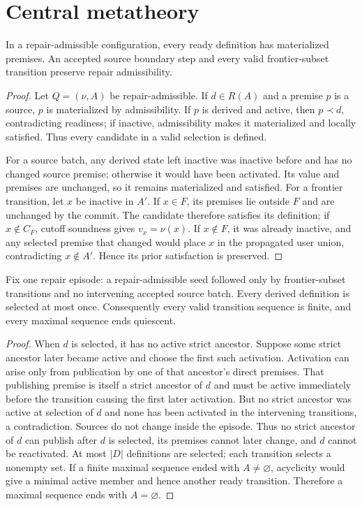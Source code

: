 \section{Central metatheory}\label{sec:meta}
\begin{lemma}\label{lem:preservation}
In a repair-admissible configuration, every ready definition has materialized premises. An accepted source boundary step and every valid frontier-subset transition preserve repair admissibility.
\end{lemma}
\begin{proof}
Let $Q=(\nu,A)$ be repair-admissible. If $d\in R(A)$ and a premise $p$ is a source, $p$ is materialized by admissibility. If $p$ is derived and active, then $p\prec d$, contradicting readiness; if inactive, admissibility makes it materialized and locally satisfied. Thus every candidate in a valid selection is defined.

For a source batch, any derived state left inactive was inactive before and has no changed source premise; otherwise it would have been activated. Its value and premises are unchanged, so it remains materialized and satisfied. For a frontier transition, let $x$ be inactive in $A'$. If $x\in F$, its premises lie outside $F$ and are unchanged by the commit. The candidate therefore satisfies its definition; if $x\notin C_F$, cutoff soundness gives $v_x=\nu(x)$. If $x\notin F$, it was already inactive, and any selected premise that changed would place $x$ in the propagated user union, contradicting $x\notin A'$. Hence its prior satisfaction is preserved.
\end{proof}

\begin{lemma}\label{lem:progress}
Fix one repair episode: a repair-admissible seed followed only by frontier-subset transitions and no intervening accepted source batch. Every derived definition is selected at most once. Consequently every valid transition sequence is finite, and every maximal sequence ends quiescent.
\end{lemma}
\begin{proof}
When $d$ is selected, it has no active strict ancestor. Suppose some strict ancestor later became active and choose the first such activation. Activation can arise only from publication by one of that ancestor's direct premises. That publishing premise is itself a strict ancestor of $d$ and must be active immediately before the transition causing the first later activation. But no strict ancestor was active at selection of $d$ and none has been activated in the intervening transitions, a contradiction. Sources do not change inside the episode. Thus no strict ancestor of $d$ can publish after $d$ is selected, its premises cannot later change, and $d$ cannot be reactivated. At most $|D|$ definitions are selected; each transition selects a nonempty set. If a finite maximal sequence ended with $A\neq\varnothing$, acyclicity would give a minimal active member and hence another ready transition. Therefore a maximal sequence ends with $A=\varnothing$.
\end{proof}

